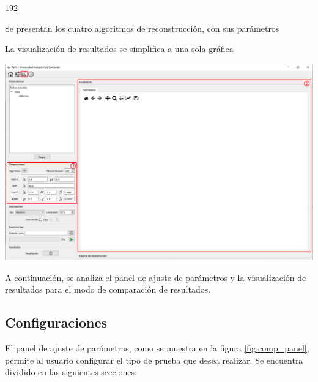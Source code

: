 \documentclass[12pt,twoside,letter]{ol-softwaremanual}
\newenvironment{Figure}
  {\par\medskip\noindent\minipage{\linewidth}}
  {\endminipage\par\medskip}
\begin{document}
\begin{dingautolist}{192}
	\setlength\itemsep{0em}
	\item Se presentan los cuatro algoritmos de reconstrucción, con sus parámetros
	\item La visualización de resultados se simplifica a una sola gráfica
\end{dingautolist}

\begin{Figure}
	\centering
	\includegraphics[width=0.85\linewidth]{main-comp.png}
	\label{fig:main-comp}
\end{Figure}

A continuación, se analiza el panel de ajuste de parámetros y la visualización de resultados para el modo de comparación de resultados.

\subsection{Configuraciones}

El panel de ajuste de parámetros, como se muestra en la figura \ref{fig:comp_panel}, permite al usuario configurar el tipo de prueba que desea realizar. Se encuentra dividido en las siguientes secciones:
\end{document}

